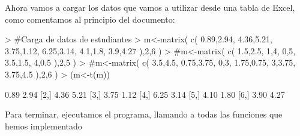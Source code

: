 \documentclass[parskip=full]{scrartcl}
\begin{document}
Ahora vamos a cargar los datos que vamos a utilizar desde una tabla de Excel, como comentamos al principio del documento:


\begin{Schunk}
\begin{Sinput}
> #Carga de datos de estudiantes
> m<-matrix( c( 0.89,2.94, 4.36,5.21, 3.75,1.12, 6.25,3.14, 4.1,1.8, 3.9,4.27 ),2,6 )
> #m<-matrix( c( 1.5,2.5, 1,4, 0,5, 3.5,1.5, 4,0.5 ),2,5 )
> #m<-matrix( c( 3.5,4.5, 0.75,3.75, 0,3, 1.75,0.75, 3,3.75, 3.75,4.5 ),2,6 )
> (m<-t(m))
\end{Sinput}
\begin{Soutput}
     [,1] [,2]
[1,] 0.89 2.94
[2,] 4.36 5.21
[3,] 3.75 1.12
[4,] 6.25 3.14
[5,] 4.10 1.80
[6,] 3.90 4.27
\end{Soutput}
\end{Schunk}


Para terminar, ejecutamos el programa, llamando a todas las funciones que hemos implementado
\end{document}
